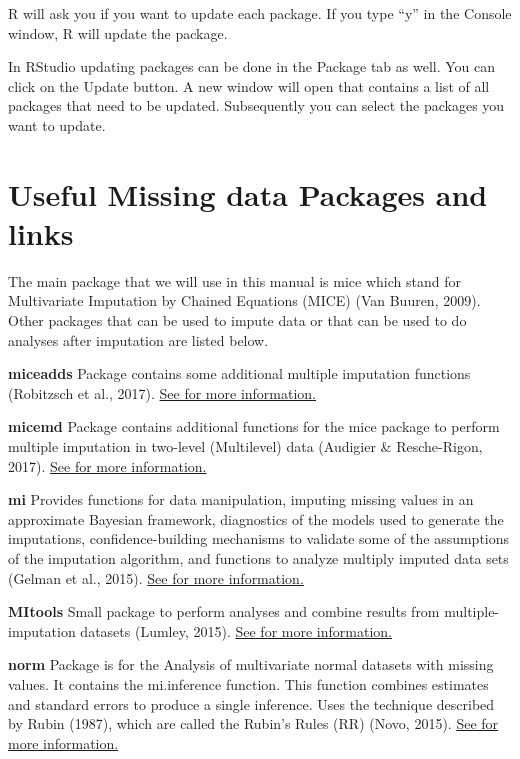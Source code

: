 \documentclass[
]{book}
\begin{document}
R will ask you if you want to update each package. If you type ``y'' in the Console window, R will update the package.

In RStudio updating packages can be done in the Package tab as well. You can click on the Update button. A new window will open that contains a list of all packages that need to be updated. Subsequently you can select the packages you want to update.

\hypertarget{useful-missing-data-packages-and-links}{%
\section{Useful Missing data Packages and links}\label{useful-missing-data-packages-and-links}}

The main package that we will use in this manual is mice which stand for Multivariate Imputation by Chained Equations (MICE) (Van Buuren, 2009). Other packages that can be used to impute data or that can be used to do analyses after imputation are listed below.

\textbf{miceadds}
Package contains some additional multiple imputation functions (Robitzsch et al., 2017).
\href{https://cran.r-project.org/web/packages/miceadds/index.html}{See for more information.}

\textbf{micemd}
Package contains additional functions for the mice package to perform multiple imputation in two-level (Multilevel) data (Audigier \& Resche-Rigon, 2017).
\href{https://cran.r-project.org/web/packages/micemd/index.html}{See for more information.}

\textbf{mi}
Provides functions for data manipulation, imputing missing values in an approximate Bayesian framework, diagnostics of the models used to generate the imputations, confidence-building mechanisms to validate some of the assumptions of the imputation algorithm, and functions to analyze multiply imputed data sets (Gelman et al., 2015).
\href{https://cran.r-project.org/web/packages/mi/index.html}{See for more information.}

\textbf{MItools}
Small package to perform analyses and combine results from multiple-imputation datasets (Lumley, 2015).
\href{https://cran.r-project.org/web/packages/mitools/index.html}{See for more information.}

\textbf{norm}
Package is for the Analysis of multivariate normal datasets with missing values. It contains the mi.inference function. This function combines estimates and standard errors to produce a single inference. Uses the technique described by Rubin (1987), which are called the Rubin's Rules (RR) (Novo, 2015).
\href{https://cran.r-project.org/web/packages/norm/index.html}{See for more information.}
\end{document}
